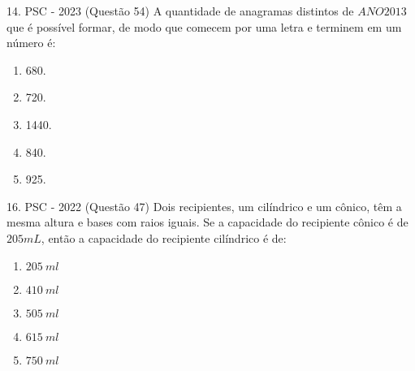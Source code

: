 \documentclass[aspectratio=169]{beamer}
\newif\ifusarcorvermelha
\newcommand{\vermelho}[1]{%
    \ifusarcorvermelha
        {\color{red}#1}%
    \else
        #1%
    \fi
}
\begin{document}
    \begin{frame}{14. PSC  - 2023 (Questão 54)}
        A quantidade de anagramas distintos de $ANO2013$ que é possível formar, de modo que comecem por uma letra e terminem em um número é:
       
         \begin{enumerate}[a]
            \item 680.
            \item 720.
            \item \vermelho{1440.}
            \item 840.
            \item 925.

        \end{enumerate}        
    \end{frame}

    \begin{frame}{16. PSC  - 2022 (Questão 47)}
        Dois recipientes, um cilíndrico e um cônico, têm a mesma altura e bases com raios iguais. Se a capacidade do recipiente cônico é de $205 mL$, então a capacidade do recipiente cilíndrico é de:

        \begin{enumerate}[a]
            \item $205\ ml$
            \item $410\ ml$
            \item $505\ ml$
            \item \vermelho{$615\ ml$} %
            \item $750\ ml$

        \end{enumerate}        
    \end{frame}
\end{document}
